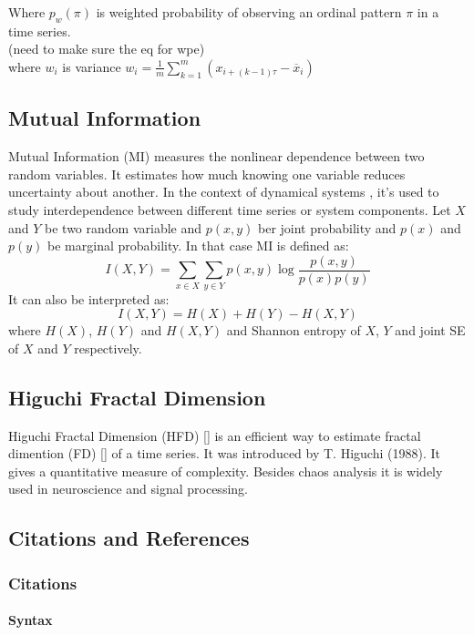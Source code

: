 \documentclass[%
 reprint,
 amsmath,amssymb,
 aps,
 floatfix,
]{revtex4-2}
\begin{document}
Where $p_w(\pi)$ is weighted probability of observing an ordinal pattern $\pi$ in a time series.\\
 (need to make sure the eq for wpe)\\
where $w_i$ is variance $w_i = \frac{1}{m} \sum_{k=1}^{m} (x_{i+(k-1)\tau} - \overline{x}_i) $
\subsection{Mutual Information}
Mutual Information (MI) measures the nonlinear dependence between two random variables. It estimates how much knowing one variable reduces uncertainty about another. In the context of dynamical systems , it's used to study interdependence between different time series or system components. Let $X$ and $Y$ be two random variable and $p(x,y)$ ber joint probability and $p(x)$ and $p(y)$ be marginal probability. In that case MI is defined as:
\begin{equation}
	I(X,Y) = \sum_{x\in X} \sum_{y\in Y} p(x,y) \log \frac{p(x,y)}{p(x)p(y)}
\end{equation}
It can also be interpreted as:
\begin{equation}
	I(X,Y) = H(X) + H(Y) - H(X,Y)
\end{equation}
where $H(X)$, $H(Y)$ and $H(X,Y)$ and Shannon entropy of $X$, $Y$ and joint SE of $X$ and $Y$ respectively.
\subsection{Higuchi Fractal Dimension}
Higuchi Fractal Dimension (HFD) [] is an efficient way to estimate fractal dimention (FD) [] of a time series. It was introduced by T. Higuchi (1988). It gives a quantitative measure of complexity. Besides chaos analysis it is widely used in neuroscience and signal processing. 
\subsection{\label{sec:citeref}Citations and References}


\subsubsection{Citations}


\paragraph{Syntax}
\end{document}
